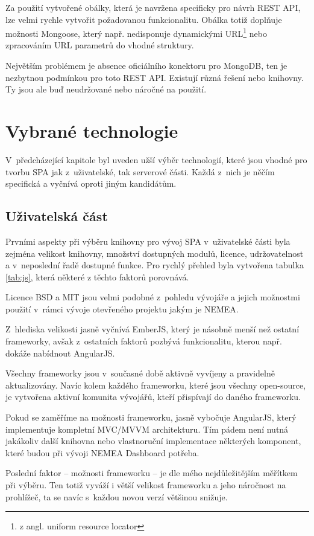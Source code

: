 Za použití vytvořené obálky, která je navržena specificky pro návrh REST API, lze velmi rychle vytvořit požadovanou funkcionalitu. Obálka totiž doplňuje možnosti Mongoose, který např. nedisponuje dynamickými URL\footnote{z angl. uniform resource locator} nebo zpracováním URL parametrů do vhodné struktury.

Největším problémem je absence oficiálního konektoru pro MongoDB, ten je nezbytnou podmínkou pro toto REST API. Existují různá řešení nebo knihovny. Ty jsou ale buď neudržované nebo náročné na použití.

\section{Vybrané technologie}

V~předcházející kapitole byl uveden užší výběr technologií, které jsou vhodné pro tvorbu SPA jak z~uživatelské, tak serverové části. Každá z~nich je něčím specifická a vyčnívá oproti jiným kandidátům.

\subsection{Uživatelská část}

Prvními aspekty při výběru knihovny pro vývoj SPA v~uživatelské části byla zejména velikost knihovny, množství dostupných modulů, licence, udržovatelnost a v~neposlední řadě dostupné funkce. Pro rychlý přehled byla vytvořena tabulka \ref{tab:js}, která některé z těchto faktorů porovnává.

Licence BSD a MIT jsou velmi podobné z~pohledu vývojáře a jejich možnostmi použití v~rámci vývoje otevřeného projektu jakým je NEMEA.

Z~hlediska velikosti jasně vyčnívá EmberJS, který je násobně menší než ostatní frameworky, avšak z~ostatních faktorů pozbývá funkcionalitu, kterou např. dokáže nabídnout AngularJS.

Všechny frameworky jsou v~současné době aktivně vyvíjeny a pravidelně aktualizovány. Navíc kolem každého frameworku, které jsou všechny open-source, je vytvořena aktivní komunita vývojářů, kteří přispívají do daného frameworku.

Pokud se zaměříme na možnosti frameworku, jasně vybočuje AngularJS, který implementuje kompletní MVC/MVVM architekturu. Tím pádem není nutná jakákoliv další knihovna nebo vlastnoruční implementace některých komponent, které budou při vývoji NEMEA Dashboard potřeba.

Poslední faktor -- možnosti frameworku -- je dle mého nejdůležitějším měřítkem při výběru. Ten totiž vyváží i větší velikost frameworku a jeho náročnost na prohlížeč, ta se navíc s~každou novou verzí většinou snižuje.

